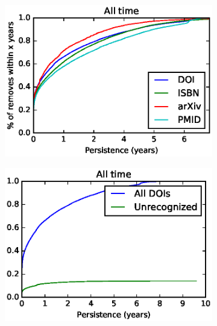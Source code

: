 \begin{figure}[h]
    \centering
    \begin{subfigure}{.5\textwidth}
        \centering
        \includegraphics[keepaspectratio=true, width=1\linewidth]{assets/irrelevant_identifiers_persistence_cdf_max}
\label{fig:irrelevant_identifiers_persistence_cdf_max}
    \end{subfigure}%
    \begin{subfigure}{.5\textwidth}
        \centering
        \includegraphics[keepaspectratio=true, width=1\linewidth]{assets/irrelevant_doi_persistence_cdf_max}
\label{fig:irrelevant_doi_persistence_cdf_max}
    \end{subfigure}


\end{figure}
